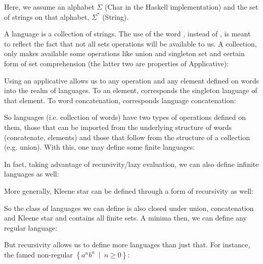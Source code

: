 Here, we assume an alphabet $\Sigma$ (\textsf{Char} in the Haskell implementation) and the set of strings on that alphabet, $\Sigma^*$ (\textsf{String}).

A language is a collection of strings. The use of the word , instead of , is meant to reflect the fact that not all sets operations will be available to us. A collection, only makes available some operations like union and singleton set and certain form of set comprehension (the latter two are properties of \textsf{Applicative}): 



Using an applicative allows us to  any operation and any element defined on words into the realm of languages. To an element, corresponds the singleton language of that element. To word concatenation, corresponds language concatenation:



So languages (i.e. collection of words) have two types of operations defined on them, those that can be imported from the underlying structure of words (concatenate, elements) and those that follow from the structure of a collection (e.g. union). With this, one may define some finite languages:



In fact, taking advantage of recursivity/lazy evaluation, we can also define infinite languages as well:



More generally, Kleene star can be defined through a form of recursivity as well:



So the class of languages we can define is also closed under union, concatenation and Kleene star and contains all finite sets. A minima then, we can define any regular language:



But recursivity allows us to define more languages than just that. For instance, the famed non-regular $\left\lbrace a^nb^n\ \middle|\ n\geq 0\right\rbrace$:



